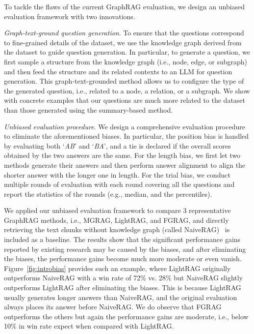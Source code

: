 To tackle the flaws of the current GraphRAG evaluation, we design an unbiased evaluation framework with two innovations.

\squishlist
\item \textit{Graph-text-ground question generation}. To ensure that the questions correspond to fine-grained details of the dataset, we use the knowledge graph derived from the dataset to guide question generation. In particular, to generate a question, we first sample a structure from the knowledge graph (i.e., node, edge, or subgraph) and then feed the structure and its related contexts to an LLM for question generation. This graph-text-grounded method allows us to configure the type of the generated question, i.e., related to a node, a relation, or a subgraph. We show with concrete examples that our questions are much more related to the dataset than those generated using the summary-based method.



\item \textit{Unbiased evaluation procedure}. We design a comprehensive evaluation procedure to eliminate the aforementioned biases. In particular, the position bias is handled by evaluating both `\textit{AB}' and `\textit{BA}', and a tie is declared if the overall scores obtained by the two answers are the same. For the length bias, we first let two methods generate their answers and then perform answer alignment to align the shorter answer with the longer one in length. For the trial bias, we conduct multiple rounds of evaluation with each round covering all the questions and report the statistics of the rounds (e.g., median, and the percentiles).  

\squishend










We applied our unbiased evaluation framework to compare 3 representative GraphRAG methods, i.e., MGRAG, LightRAG, and FGRAG, and directly retrieving the text chunks without knowledge graph (called NaiveRAG)~\cite{gao2023retrieval} is included as a baseline. The results show that the significant performance gains reported by existing research may be caused by the biases, and after eliminating the biases, the  
performance gains become much more moderate or even vanish. Figure~\ref{fig:introbias} provides such an example, where LightRAG originally outperforms NaiveRAG with a win rate of 72\% vs. 28\% but NaiveRAG slightly outperforms LightRAG after eliminating the biases. This is because LightRAG usually generates longer answers than NaiveRAG, and the original evaluation always places its answer before NaiveRAG. We do observe that FGRAG outperforms the others but again the performance gains are moderate, i.e., below 10\% in win rate expect when compared with LightRAG. 

